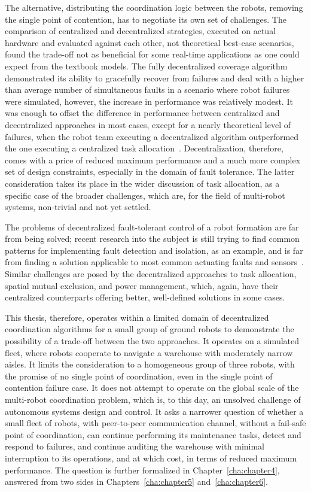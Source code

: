 The alternative, distributing the coordination logic between the robots, removing the single point of contention, has to negotiate its own set of challenges. The comparison of centralized and decentralized strategies, executed on actual hardware and evaluated against each other, not theoretical best-case scenarios, found the trade-off not as beneficial for some real-time applications as one could expect from the textbook models. The fully decentralized coverage algorithm demonstrated its ability to gracefully recover from failures and deal with a higher than average number of simultaneous faults in a scenario where robot failures were simulated, however, the increase in performance was relatively modest. It was enough to offset the difference in performance between centralized and decentralized approaches in most cases, except for a nearly theoretical level of failures, when the robot team executing a decentralized algorithm outperformed the one executing a centralized task allocation~\cite{jamshidpey2025centralization}. Decentralization, therefore, comes with a price of reduced maximum performance and a much more complex set of design constraints, especially in the domain of fault tolerance. The latter consideration takes its place in the wider discussion of task allocation, as a specific case of the broader challenges, which are, for the field of multi-robot systems, non-trivial and not yet settled.

The problems of decentralized fault-tolerant control of a robot formation are far from being solved; recent research into the subject is still trying to find common patterns for implementing fault detection and isolation, as an example, and is far from finding a solution applicable to most common actuating faults and sensors~\cite{elsayed2024decentralized}. Similar challenges are posed by the decentralized approaches to task allocation, spatial mutual exclusion, and power management, which, again, have their centralized counterparts offering better, well-defined solutions in some cases.

This thesis, therefore, operates within a limited domain of decentralized coordination algorithms for a small group of ground robots to demonstrate the possibility of a trade-off between the two approaches. It operates on a simulated fleet, where robots cooperate to navigate a warehouse with moderately narrow aisles. It limits the consideration to a homogeneous group of three robots, with the promise of no single point of coordination, even in the single point of contention failure case. It does not attempt to operate on the global scale of the multi-robot coordination problem, which is, to this day, an unsolved challenge of autonomous systems design and control. It asks a narrower question of whether a small fleet of robots, with peer-to-peer communication channel, without a fail-safe point of coordination, can continue performing its maintenance tasks, detect and respond to failures, and continue auditing the warehouse with minimal interruption to its operations, and at which cost, in terms of reduced maximum performance. The question is further formalized in Chapter~\ref{cha:chapter4}, answered from two sides in Chapters~\ref{cha:chapter5} and~\ref{cha:chapter6}.

